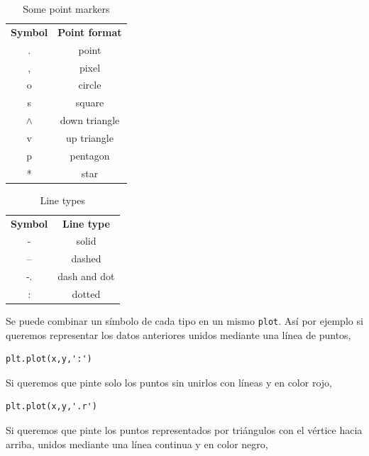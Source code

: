\begin{paracol}{2}
    
    \begin{table}
        \centering
        \begin{tabular}{|c|c|} \hline
        \textbf{Symbol}     &  \textbf{Point format}\\
             .& point \\ \hline
             ,& pixel\\ \hline
             o& circle \\ \hline
             s& square\\ \hline
             $\wedge$ & down triangle\\ \hline
             v& up triangle\\ \hline
             p& pentagon\\ \hline
             *& star\\ \hline
        \end{tabular}
        \caption{Some point markers}
        \label{tab:dots}
    \end{table}

      \begin{table}
        \centering
        \begin{tabular}{|c|c|} \hline
        \textbf{Symbol}     &  \textbf{Line type}\\
             -& solid \\ \hline
             --& dashed\\ \hline
             -.& dash and dot\\ \hline
             :& dotted\\ \hline
        \end{tabular}
        \caption{Line types}
        \label{tab:lines}
    \end{table}  
    
    \switchcolumn
    Se puede combinar un símbolo de cada tipo en un mismo \texttt{plot}. Así por ejemplo si queremos representar los datos anteriores unidos mediante una línea de puntos,
\begin{verbatim}
plt.plot(x,y,':')    
\end{verbatim}

Si queremos que pinte solo los puntos sin unirlos con líneas y en color rojo,
\begin{verbatim}
plt.plot(x,y,'.r')
\end{verbatim}

Si queremos que pinte los puntos representados por triángulos con el vértice hacia arriba, unidos mediante una línea continua y en color negro,


\end{paracol}
